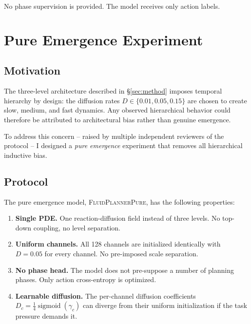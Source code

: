 \documentclass{article}
\DeclareMathOperator{\sigmoid}{sigmoid}
\begin{document}
No phase supervision is provided. The model receives only action labels.

\section{Pure Emergence Experiment}
\label{sec:emergence}

\subsection{Motivation}

The three-level architecture described in \S\ref{sec:method} imposes temporal hierarchy by design: the diffusion rates $D \in \{0.01, 0.05, 0.15\}$ are chosen to create slow, medium, and fast dynamics. Any observed hierarchical behavior could therefore be attributed to architectural bias rather than genuine emergence.

To address this concern -- raised by multiple independent reviewers of the protocol -- I designed a \emph{pure emergence} experiment that removes all hierarchical inductive bias.

\subsection{Protocol}

The pure emergence model, \textsc{FluidPlannerPure}, has the following properties:

\begin{enumerate}
    \item \textbf{Single PDE.} One reaction-diffusion field instead of three levels. No top-down coupling, no level separation.
    \item \textbf{Uniform channels.} All 128 channels are initialized identically with $D = 0.05$ for every channel. No pre-imposed scale separation.
    \item \textbf{No phase head.} The model does not pre-suppose a number of planning phases. Only action cross-entropy is optimized.
    \item \textbf{Learnable diffusion.} The per-channel diffusion coefficients $D_c = \frac{1}{4}\sigmoid(\gamma_c)$ can diverge from their uniform initialization if the task pressure demands it.
\end{enumerate}
\end{document}
